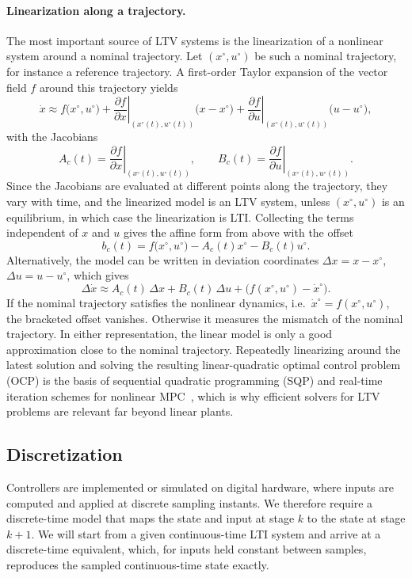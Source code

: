 \paragraph{Linearization along a trajectory.}
The most important source of LTV systems is the linearization of a nonlinear system around a nominal trajectory.
Let $(x^\circ, u^\circ)$ be such a nominal trajectory, for instance a reference trajectory.
A first-order Taylor expansion of the vector field $f$ around this trajectory yields
\[
\dot{x} \approx f\big(x^\circ, u^\circ\big) + \left. \frac{\partial f}{\partial x} \right|_{(x^\circ(t), u^\circ(t))} \big(x - x^\circ\big) + \left. \frac{\partial f}{\partial u} \right|_{(x^\circ(t), u^\circ(t))} \big(u - u^\circ\big),
\]
with the Jacobians
\[
A_c(t) = \left. \frac{\partial f}{\partial x} \right|_{(x^\circ(t), u^\circ(t))},
\qquad
B_c(t) = \left. \frac{\partial f}{\partial u} \right|_{(x^\circ(t), u^\circ(t))}.
\]
Since the Jacobians are evaluated at different points along the trajectory, they vary with time, and the linearized model is an LTV system, unless $(x^\circ, u^\circ)$ is an equilibrium, in which case the linearization is LTI.
Collecting the terms independent of $x$ and $u$ gives the affine form from above with the offset
\[
b_c(t) = f\big(x^\circ, u^\circ\big) - A_c(t) x^\circ - B_c(t) u^\circ.
\]
Alternatively, the model can be written in deviation coordinates $\Delta x = x - x^\circ$, $\Delta u = u - u^\circ$, which gives
\[
\Delta \dot{x} \approx A_c(t)\, \Delta x + B_c(t)\, \Delta u + \big( f(x^\circ, u^\circ) - \dot{x}^\circ \big).
\]
If the nominal trajectory satisfies the nonlinear dynamics, i.e.\ $\dot{x}^\circ = f(x^\circ, u^\circ)$, the bracketed offset vanishes.
Otherwise it measures the mismatch of the nominal trajectory.
In either representation, the linear model is only a good approximation close to the nominal trajectory.
Repeatedly linearizing around the latest solution and solving the resulting linear-quadratic optimal control problem (OCP) is the basis of sequential quadratic programming (SQP) and real-time iteration schemes for nonlinear MPC~\cite{diehl2005real}, which is why efficient solvers for LTV problems are relevant far beyond linear plants.

\subsection{Discretization}

Controllers are implemented or simulated on digital hardware, where inputs are computed and applied at discrete sampling instants.
We therefore require a discrete-time model that maps the state and input at stage $k$ to the state at stage $k+1$.
We will start from a given continuous-time LTI system and arrive at a discrete-time equivalent, which, for inputs held constant between samples, reproduces the sampled continuous-time state exactly.

